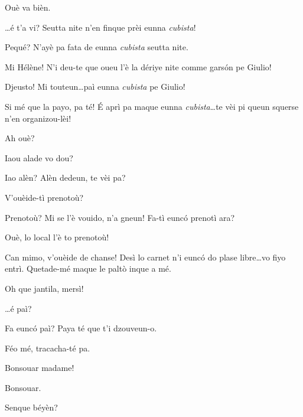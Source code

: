 \begin{drama}
\Helenespeaks Ouè va bièn.

\Bertaspeaks \ldots é t'a vi? Seutta nite n'en finque prèi eunna \textit{cubista}!

\Helenespeaks Pequé? N'ayè pa fata de eunna \textit{cubista} seutta nite.

\Bertaspeaks Mi Hélène! N'i deu-te que oueu l'è la dériye nite comme gars\'on pe Giulio!

\Helenespeaks Djeusto! Mi touteun\ldots paì eunna \textit{cubista} pe Giulio!

\Bertaspeaks Si mé que la payo, pa té! \'E aprì pa maque eunna \textit{cubista}\ldots te vèi pi queun squerse n'en organizou-lèi!

\Helenespeaks Ah ouè?




\Dorinaspeaks Iaou alade vo dou?

\Pierrespeaks Iao alèn? Alèn dedeun, te vèi pa?

\Dorinaspeaks V'ouèide-tì prenotoù?

\Pierrespeaks Prenotoù? Mi se l'è vouido, n'a gneun! Fa-tì eunc\'o prenotì ara?

\Dorinaspeaks Ouè, lo local l'è to prenotoù!

\Dorinaspeaks Can mimo, v'ouèide de chanse! Desì lo carnet n'i eunc\'o do plase libre\ldots vo fiyo entrì. Quetade-mé maque le palt\`o inque a mé.

\Pierrespeaks Oh que jantila, mersì!


\Dorinaspeaks \ldots é paì?

\Pierrespeaks Fa eunc\'o paì? Paya té que t'i dzouveun-o.

\Louisspeaks Féo mé, tracacha-té pa.


\Pierrespeaks{} Bonsouar madame!

\Bertaspeaks{} Bonsouar.

\Pierrespeaks{} Senque béyèn?


\end{drama}
